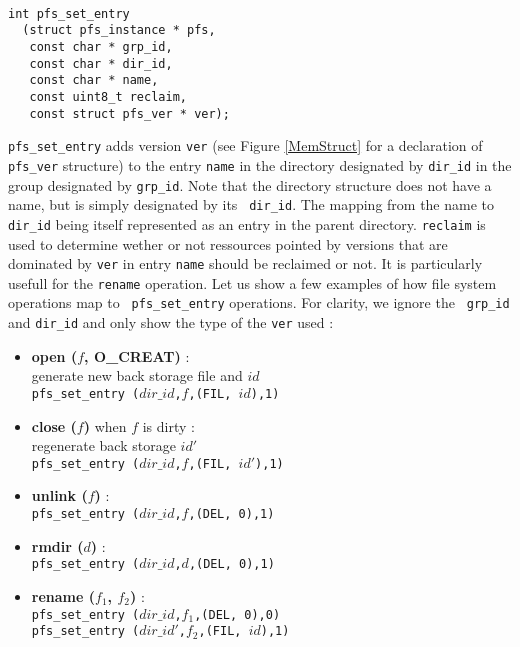\begin{center}
{\tt \small
\begin{verbatim}
int pfs_set_entry 
  (struct pfs_instance * pfs,
   const char * grp_id,
   const char * dir_id,
   const char * name,
   const uint8_t reclaim,
   const struct pfs_ver * ver);
\end{verbatim}
}
\end{center}

{\tt pfs\_set\_entry} adds version {\tt ver} (see Figure
\ref{MemStruct} for a declaration of {\tt pfs\_ver} structure) to the
entry {\tt name} in the directory designated by {\tt dir\_id} in the
group designated by {\tt grp\_id}. Note that the directory structure
does not have a name, but is simply designated by its {\tt
  dir\_id}. The mapping from the name to {\tt dir\_id} being itself
represented as an entry in the parent directory.  {\tt reclaim} is
used to determine wether or not ressources pointed by versions that
are dominated by {\tt ver} in entry {\tt name} should be reclaimed or
not. It is particularly usefull for the {\tt rename} operation. Let us
show a few examples of how file system operations map to {\tt
  pfs\_set\_entry} operations. For clarity, we ignore the {\tt
  grp\_id} and {\tt dir\_id} and only show the type of the {\tt ver}
used :

\begin{itemize}
  \item \textbf{open ($f$, O\_CREAT)} : \\
    generate new back storage file and $id$ \\
    {\tt pfs\_set\_entry ($dir\_id$,$f$,(FIL, $id$),1)}

  \item \textbf{close ($f$)} when $f$ is dirty : \\
    regenerate back storage $id'$ \\
    {\tt pfs\_set\_entry ($dir\_id$,$f$,(FIL, $id'$),1)}
    
  \item \textbf{unlink ($f$)} : \\
    {\tt pfs\_set\_entry ($dir\_id$,$f$,(DEL, 0),1)}

  \item \textbf{rmdir ($d$)} : \\
    {\tt pfs\_set\_entry ($dir\_id$,$d$,(DEL, 0),1)}

  \item \textbf{rename ($f_1$, $f_2$)} : \\
    {\tt pfs\_set\_entry ($dir\_id$,$f_1$,(DEL, 0),0)} \\
    {\tt pfs\_set\_entry ($dir\_id'$,$f_2$,(FIL, $id$),1)}
\end{itemize}

